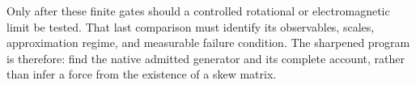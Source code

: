 Only after these finite gates should a controlled rotational or electromagnetic limit be tested. That last comparison must identify its observables, scales, approximation regime, and measurable failure condition. The sharpened program is therefore: find the native admitted generator and its complete account, rather than infer a force from the existence of a skew matrix.
\endgroup
\setcounter{section}{37}
